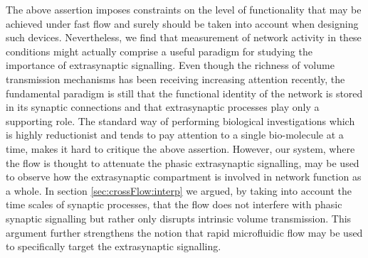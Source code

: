 The above assertion imposes constraints on the level of functionality that may be achieved under fast flow and surely should be taken into account when designing such devices. Nevertheless, we find that measurement of network activity in these conditions might actually comprise a useful paradigm for studying the importance of extrasynaptic signalling. Even though the richness of volume transmission mechanisms has been receiving increasing attention recently, the fundamental paradigm is still that the functional identity of the network is stored in its synaptic connections and that extrasynaptic processes play only a supporting role. The standard way of performing biological investigations which is highly reductionist and tends to pay attention to a single bio-molecule at a time, makes it hard to critique the above assertion. However, our system, where the flow is thought to attenuate the phasic extrasynaptic signalling, may be used to observe how the extrasynaptic compartment is involved in network function as a whole. In section \ref{sec:crossFlow:interp} we argued, by taking into account the time scales of synaptic processes, that the flow does not interfere with phasic synaptic signalling but rather only disrupts intrinsic volume transmission. This argument further strengthens the notion that rapid microfluidic flow may be used to specifically target the extrasynaptic signalling.

